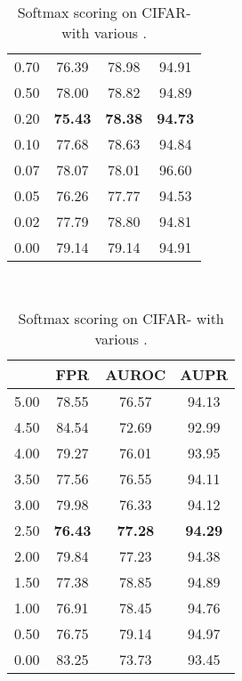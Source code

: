 \documentclass{article}
\begin{document}
\begin{table}[t]
{{\begin{tabular}{c|ccc}
0.70               & 76.39                  & 78.98                  & 94.91 \\
0.50               & 78.00                  & 78.82                  & 94.89 \\
\cellcolor{greyC}0.20               & \cellcolor{greyC}\textbf{75.43}                  & \cellcolor{greyC}\textbf{78.38}                  & \cellcolor{greyC}\textbf{94.73} \\
0.10               & 77.68                  & 78.63                  & 94.84 \\
0.07               & 78.07                  & 78.01                  & 96.60 \\
0.05               & 76.26                  & 77.77                  & 94.53 \\ 
0.02               & 77.79                  & 78.80                  & 94.81 \\
0.00               & 79.14                  & 79.14                  & 94.91 \\
\bottomrule[1.5pt]      
\end{tabular}
}
}~~
\parbox{.30\linewidth}{
\centering
\caption{Softmax scoring on CIFAR- with various  .} \label{tab: ablation rho full se cifar100}
\scriptsize
\vspace{5pt}
{
\begin{tabular}{c|ccc}
\toprule[1.5pt]
          & FPR     & AUROC       & AUPR     \\
\midrule[0.6pt]
5.00               & 78.55                  & 76.57                  & 94.13 \\
4.50               & 84.54                  & 72.69                  & 92.99 \\
4.00               & 79.27                  & 76.01                  & 93.95 \\
3.50               & 77.56                  & 76.55                  & 94.11 \\
3.00               & 79.98                  & 76.33                  & 94.12 \\
\cellcolor{greyC}2.50               & \cellcolor{greyC}\textbf{76.43}                  & \cellcolor{greyC}\textbf{77.28}                  & \cellcolor{greyC}\textbf{94.29} \\
2.00               & 79.84                  & 77.23                  & 94.38 \\
1.50               & 77.38                  & 78.85                  & 94.89 \\
1.00               & 76.91                  & 78.45                  & 94.76 \\
0.50               & 76.75                  & 79.14                  & 94.97 \\
0.00               & 83.25                  & 73.73                  & 93.45 \\
\bottomrule[1.5pt]      
\end{tabular}
}
}
\end{table}
\end{document}
